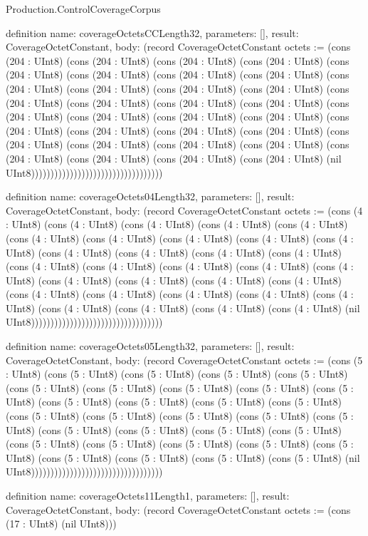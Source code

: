 \begin{lexlean}{Production.ControlCoverageCorpus}
\begin{semanticmodule}
definition{
  name: coverageOctetsCCLength32,
  parameters: [],
  result: CoverageOctetConstant,
  body: (record CoverageOctetConstant {octets := (cons (204 : UInt8) (cons (204 : UInt8) (cons (204 : UInt8) (cons (204 : UInt8) (cons (204 : UInt8) (cons (204 : UInt8) (cons (204 : UInt8) (cons (204 : UInt8) (cons (204 : UInt8) (cons (204 : UInt8) (cons (204 : UInt8) (cons (204 : UInt8) (cons (204 : UInt8) (cons (204 : UInt8) (cons (204 : UInt8) (cons (204 : UInt8) (cons (204 : UInt8) (cons (204 : UInt8) (cons (204 : UInt8) (cons (204 : UInt8) (cons (204 : UInt8) (cons (204 : UInt8) (cons (204 : UInt8) (cons (204 : UInt8) (cons (204 : UInt8) (cons (204 : UInt8) (cons (204 : UInt8) (cons (204 : UInt8) (cons (204 : UInt8) (cons (204 : UInt8) (cons (204 : UInt8) (cons (204 : UInt8) (nil UInt8)))))))))))))))))))))))))))))))))})
}

definition{
  name: coverageOctets04Length32,
  parameters: [],
  result: CoverageOctetConstant,
  body: (record CoverageOctetConstant {octets := (cons (4 : UInt8) (cons (4 : UInt8) (cons (4 : UInt8) (cons (4 : UInt8) (cons (4 : UInt8) (cons (4 : UInt8) (cons (4 : UInt8) (cons (4 : UInt8) (cons (4 : UInt8) (cons (4 : UInt8) (cons (4 : UInt8) (cons (4 : UInt8) (cons (4 : UInt8) (cons (4 : UInt8) (cons (4 : UInt8) (cons (4 : UInt8) (cons (4 : UInt8) (cons (4 : UInt8) (cons (4 : UInt8) (cons (4 : UInt8) (cons (4 : UInt8) (cons (4 : UInt8) (cons (4 : UInt8) (cons (4 : UInt8) (cons (4 : UInt8) (cons (4 : UInt8) (cons (4 : UInt8) (cons (4 : UInt8) (cons (4 : UInt8) (cons (4 : UInt8) (cons (4 : UInt8) (cons (4 : UInt8) (nil UInt8)))))))))))))))))))))))))))))))))})
}

definition{
  name: coverageOctets05Length32,
  parameters: [],
  result: CoverageOctetConstant,
  body: (record CoverageOctetConstant {octets := (cons (5 : UInt8) (cons (5 : UInt8) (cons (5 : UInt8) (cons (5 : UInt8) (cons (5 : UInt8) (cons (5 : UInt8) (cons (5 : UInt8) (cons (5 : UInt8) (cons (5 : UInt8) (cons (5 : UInt8) (cons (5 : UInt8) (cons (5 : UInt8) (cons (5 : UInt8) (cons (5 : UInt8) (cons (5 : UInt8) (cons (5 : UInt8) (cons (5 : UInt8) (cons (5 : UInt8) (cons (5 : UInt8) (cons (5 : UInt8) (cons (5 : UInt8) (cons (5 : UInt8) (cons (5 : UInt8) (cons (5 : UInt8) (cons (5 : UInt8) (cons (5 : UInt8) (cons (5 : UInt8) (cons (5 : UInt8) (cons (5 : UInt8) (cons (5 : UInt8) (cons (5 : UInt8) (cons (5 : UInt8) (nil UInt8)))))))))))))))))))))))))))))))))})
}

definition{
  name: coverageOctets11Length1,
  parameters: [],
  result: CoverageOctetConstant,
  body: (record CoverageOctetConstant {octets := (cons (17 : UInt8) (nil UInt8))})
}


\end{semanticmodule}
\end{lexlean}
